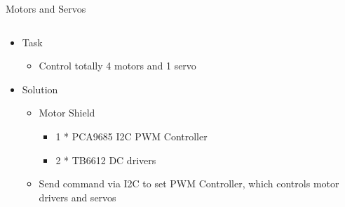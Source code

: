 \documentclass[12pt]{beamer}
\begin{document}
\begin{frame}{Motors and Servos}
    \begin{columns}
        \begin{column}{.65\linewidth}
            \begin{itemize}
                \item Task
                      \begin{itemize}
                          \item Control totally 4 motors and 1 servo
                      \end{itemize}
                \item Solution
                      \begin{itemize}
                          \item Motor Shield
                                \begin{itemize}
                                    \item 1 * PCA9685 I2C PWM Controller
                                    \item 2 * TB6612 DC drivers
                                \end{itemize}
                          \item Send command via I2C to set PWM Controller, which controls motor drivers and servos
                      \end{itemize}


\end{itemize}
\end{column}
\end{columns}
\end{frame}
\end{document}
